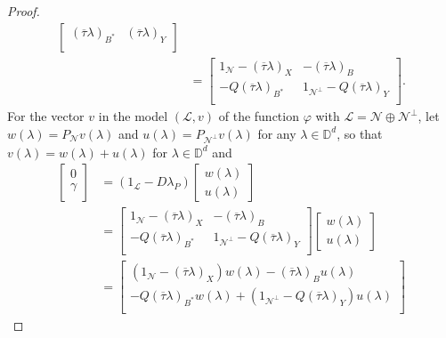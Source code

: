 \documentclass[11pt, reqno]{amsart}
\newcommand\1{\boldsymbol {1}}
\numberwithin{equation}{section}
\begin{document}
\begin{proof}
\begin{align*}
\begin{bmatrix}
                    (\overline{\tau}\lambda)_{B^{*}} & (\overline{\tau}\lambda)_{Y}\\
                    \end{bmatrix}\\
    &=\begin{bmatrix}
    1_{\mathcal{N}}-(\overline{\tau}\lambda)_{X} & -(\overline{\tau}\lambda)_{B} \\
    -Q(\overline{\tau}\lambda)_{B^{*}} & 1_{\mathcal{N}^{\perp}}-Q(\overline{\tau}\lambda)_{Y}\\
    \end{bmatrix}.
\end{align*}
For the vector $v$ in the model $(\mathcal{L},v)$ of the function $\varphi$ with $\mathcal{L}=\mathcal{N}\oplus \mathcal{N}^{\perp}$, let $w(\lambda)=P_{\mathcal{N}}v(\lambda)$ and $u(\lambda)=P_{\mathcal{N}^{\perp}}v(\lambda)$ for any $\lambda\in\mathbb{D}^{d}$, so that $v(\lambda)=w(\lambda)+u(\lambda)$ for $\lambda\in\mathbb{D}^{d}$ and
\begin{align*}
    \begin{bmatrix}
    0 \\    
    \gamma \\
    \end{bmatrix}   &=(1_{\mathcal{L}}-D\lambda_{P})\begin{bmatrix}
                        w(\lambda)\\   
                        u(\lambda) 
                    \end{bmatrix}\\
                    &=\begin{bmatrix}
    1_{\mathcal{N}}-(\overline{\tau}\lambda)_{X} & -(\overline{\tau}\lambda)_{B} \\
    -Q(\overline{\tau}\lambda)_{B^{*}} & 1_{\mathcal{N}^{\perp}}-Q(\overline{\tau}\lambda)_{Y}\\
    \end{bmatrix}\begin{bmatrix}
                        w(\lambda)\\   
                        u(\lambda) 
                    \end{bmatrix}\\
                &=\begin{bmatrix}
    (1_{\mathcal{N}}-(\overline{\tau}\lambda)_{X})w(\lambda) -(\overline{\tau}\lambda)_{B}u(\lambda) \\
    -Q(\overline{\tau}\lambda)_{B^{*}}w(\lambda)+(1_{\mathcal{N}^{\perp}}-Q(\overline{\tau}\lambda)_{Y})u(\lambda)\\

\end{bmatrix}
\end{align*}
\end{proof}
\end{document}
